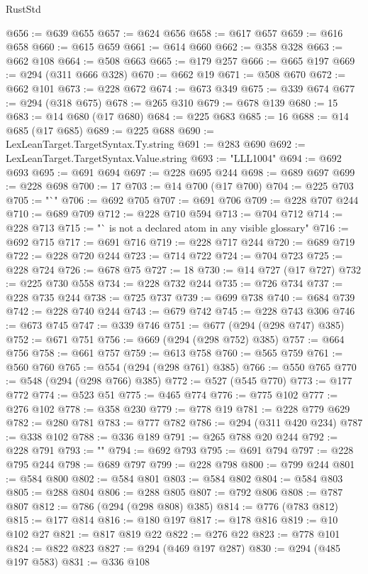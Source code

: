 \begin{lexlean}{RustStd}
\begin{coremodule}
@656 := @639 @655
@657 := @624 @656
@658 := @617 @657
@659 := @616 @658
@660 := @615 @659
@661 := @614 @660
@662 := @358 @328
@663 := @662 @108
@664 := @508 @663
@665 := @179 @257
@666 := @665 @197
@669 := @294 (@311 @666 @328)
@670 := @662 @19
@671 := @508 @670
@672 := @662 @101
@673 := @228 @672
@674 := @673 @349
@675 := @339 @674
@677 := @294 (@318 @675)
@678 := @265 @310
@679 := @678 @139
@680 := 15
@683 := @14 @680 (@17 @680)
@684 := @225 @683
@685 := 16
@688 := @14 @685 (@17 @685)
@689 := @225 @688
@690 := LexLeanTarget.TargetSyntax.Ty.string
@691 := @283 @690
@692 := LexLeanTarget.TargetSyntax.Value.string
@693 := "LLL1004"
@694 := @692 @693
@695 := @691 @694
@697 := @228 @695 @244
@698 := @689 @697
@699 := @228 @698
@700 := 17
@703 := @14 @700 (@17 @700)
@704 := @225 @703
@705 := "`"
@706 := @692 @705
@707 := @691 @706
@709 := @228 @707 @244
@710 := @689 @709
@712 := @228 @710 @594
@713 := @704 @712
@714 := @228 @713
@715 := "` is not a declared atom in any visible glossary"
@716 := @692 @715
@717 := @691 @716
@719 := @228 @717 @244
@720 := @689 @719
@722 := @228 @720 @244
@723 := @714 @722
@724 := @704 @723
@725 := @228 @724
@726 := @678 @75
@727 := 18
@730 := @14 @727 (@17 @727)
@732 := @225 @730 @558
@734 := @228 @732 @244
@735 := @726 @734
@737 := @228 @735 @244
@738 := @725 @737
@739 := @699 @738
@740 := @684 @739
@742 := @228 @740 @244
@743 := @679 @742
@745 := @228 @743 @306
@746 := @673 @745
@747 := @339 @746
@751 := @677 (@294 (@298 @747) @385)
@752 := @671 @751
@756 := @669 (@294 (@298 @752) @385)
@757 := @664 @756
@758 := @661 @757
@759 := @613 @758
@760 := @565 @759
@761 := @560 @760
@765 := @554 (@294 (@298 @761) @385)
@766 := @550 @765
@770 := @548 (@294 (@298 @766) @385)
@772 := @527 (@545 @770)
@773 := @177 @772
@774 := @523 @51
@775 := @465 @774
@776 := @775 @102
@777 := @276 @102
@778 := @358 @230
@779 := @778 @19
@781 := @228 @779 @629
@782 := @280 @781
@783 := @777 @782
@786 := @294 (@311 @420 @234)
@787 := @338 @102
@788 := @336 @189
@791 := @265 @788 @20 @244
@792 := @228 @791
@793 := ""
@794 := @692 @793
@795 := @691 @794
@797 := @228 @795 @244
@798 := @689 @797
@799 := @228 @798
@800 := @799 @244
@801 := @584 @800
@802 := @584 @801
@803 := @584 @802
@804 := @584 @803
@805 := @288 @804
@806 := @288 @805
@807 := @792 @806
@808 := @787 @807
@812 := @786 (@294 (@298 @808) @385)
@814 := @776 (@783 @812)
@815 := @177 @814
@816 := @180 @197
@817 := @178 @816
@819 := @10 @102 @27
@821 := @817 @819 @22
@822 := @276 @22
@823 := @778 @101
@824 := @822 @823
@827 := @294 (@469 @197 @287)
@830 := @294 (@485 @197 @583)
@831 := @336 @108

\end{coremodule}
\end{lexlean}
